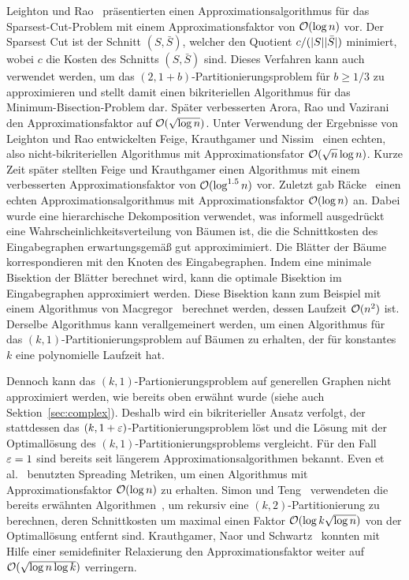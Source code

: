 Leighton und Rao~\cite{LR99} präsentierten einen Approximationsalgorithmus für das Sparsest-Cut-Problem mit einem Approximationsfaktor von $\mathcal{O}(\log n)$ vor.
Der Sparsest Cut ist der Schnitt $(S, \bar{S})$, welcher den Quotient $c/(\lvert S\rvert \lvert\bar{S}\rvert)$ minimiert, wobei $c$ die Kosten des Schnitts $(S, \bar{S})$ sind.
Dieses Verfahren kann auch verwendet werden, um das $(2, 1 + b)$\hyp Partitionierungsproblem für $b \geq 1/3$ zu approximieren und stellt damit einen bikriteriellen Algorithmus für das Minimum-Bisection-Problem dar.
Später verbesserten Arora, Rao und Vazirani~\cite{ARV09} den Approximationsfaktor auf $\mathcal{O}(\sqrt{\log n})$.
Unter Verwendung der Ergebnisse von Leighton und Rao entwickelten Feige, Krauthgamer und Nissim~\cite{FKN00} einen echten, also nicht-bikriteriellen Algorithmus mit Approximationsfator $\mathcal{O}(\sqrt{n} \log n)$.
Kurze Zeit später stellten Feige und Krauthgamer einen Algorithmus mit einem verbesserten Approximationsfaktor von $\mathcal{O}(\log^{1.5} n)$ vor.
Zuletzt gab Räcke~\cite{rc08} einen echten Approximationsalgorithmus mit Approximationsfaktor $\mathcal{O}(\log n)$ an.
Dabei wurde eine hierarchische Dekomposition verwendet, was informell ausgedrückt eine Wahrscheinlichkeitsverteilung von Bäumen ist, die die Schnittkosten des Eingabegraphen erwartungsgemäß gut approximimiert.
Die Blätter der Bäume korrespondieren mit den Knoten des Eingabegraphen.
Indem eine minimale Bisektion der Blätter berechnet wird, kann die optimale Bisektion im Eingabegraphen approximiert werden.
Diese Bisektion kann zum Beispiel mit einem Algorithmus von Macgregor~\cite{mcg78} berechnet werden, dessen Laufzeit $\mathcal{O}(n^2)$ ist.
Derselbe Algorithmus kann verallgemeinert werden, um einen Algorithmus für das $(k, 1)$\hyp Partitionierungsproblem auf Bäumen zu erhalten, der für konstantes $k$ eine polynomielle Laufzeit hat.

Dennoch kann das $(k, 1)$\hyp Partionierungsproblem auf generellen Graphen nicht approximiert werden, wie bereits oben erwähnt wurde (siehe auch Sektion~\ref{sec:complex}).
Deshalb wird ein bikriterieller Ansatz verfolgt, der stattdessen das $(k,1+\varepsilon)$\hyp Partitionierungsproblem löst und die Lösung mit der Optimallösung des $(k, 1)$\hyp Partitionierungsproblems vergleicht.
Für den Fall $\varepsilon = 1$ sind bereits seit längerem Approximationsalgorithmen bekannt.
Even et al.~\cite{ENR+97} benutzten Spreading Metriken, um einen Algorithmus mit Approximationsfaktor $\mathcal{O}(\log n)$ zu erhalten.
Simon und Teng~\cite{ST97} verwendeten die bereits erwähnten Algorithmen~\cite{LR99, ARV09}, um rekursiv eine $(k, 2)$\hyp Partitionierung zu berechnen, deren Schnittkosten um maximal einen Faktor $\mathcal{O}(\log k \sqrt{\log n})$ von der Optimallösung entfernt sind.
Krauthgamer, Naor und Schwartz~\cite{KNS09} konnten mit Hilfe einer semidefiniter Relaxierung den Approximationsfaktor weiter auf $\mathcal{O}(\sqrt{\log n \log k})$ verringern.

